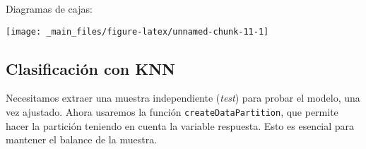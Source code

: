 \documentclass[]{book}
\newenvironment{Shaded}{\begin{snugshade}}{\end{snugshade}}
\newcommand{\CommentTok}[1]{\textcolor[rgb]{0.56,0.35,0.01}{\textit{#1}}}
\newcommand{\DataTypeTok}[1]{\textcolor[rgb]{0.13,0.29,0.53}{#1}}
\newcommand{\DecValTok}[1]{\textcolor[rgb]{0.00,0.00,0.81}{#1}}
\newcommand{\FloatTok}[1]{\textcolor[rgb]{0.00,0.00,0.81}{#1}}
\newcommand{\KeywordTok}[1]{\textcolor[rgb]{0.13,0.29,0.53}{\textbf{#1}}}
\newcommand{\NormalTok}[1]{#1}
\newcommand{\OperatorTok}[1]{\textcolor[rgb]{0.81,0.36,0.00}{\textbf{#1}}}
\newcommand{\OtherTok}[1]{\textcolor[rgb]{0.56,0.35,0.01}{#1}}
\newcommand{\StringTok}[1]{\textcolor[rgb]{0.31,0.60,0.02}{#1}}
\begin{document}
Diagramas de cajas:

\begin{Shaded}
\end{Shaded}

\begin{center}\texttt{[image: \_main\_files/figure-latex/unnamed-chunk-11-1]} \end{center}

\hypertarget{clasificaciuxf3n-con-knn}{%
\subsection{Clasificación con KNN}\label{clasificaciuxf3n-con-knn}}

Necesitamos extraer una muestra independiente (\emph{test}) para probar el modelo, una vez ajustado. Ahora usaremos la función \texttt{createDataPartition}, que permite hacer la partición teniendo en cuenta la variable respuesta. Esto es esencial para mantener el balance de la muestra.

\begin{Shaded}
\end{Shaded}
\end{document}

